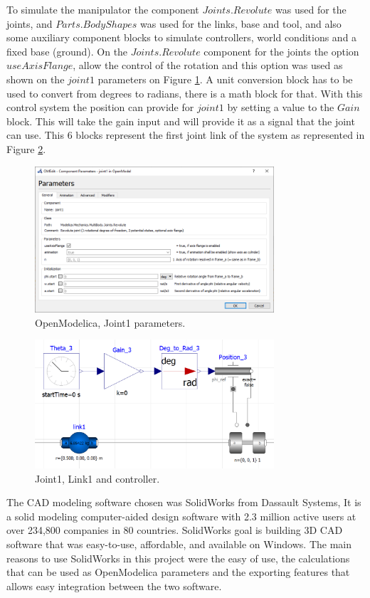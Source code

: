 \documentclass[transmag]{IEEEtran}
\begin{document}
To simulate the manipulator the component $Joints.Revolute$ was used for the joints, and $Parts.BodyShapes$ was used for the links, base and tool, and also some auxiliary component blocks to simulate controllers, world conditions and a fixed base (ground).
On the $Joints.Revolute$ component for the joints the option $useAxisFlange$, allow the control of the rotation and this option was used as shown on the $joint1$ parameters on Figure \ref{Joint1Parameters}. 
A unit conversion block has to be used to convert from degrees to radians, there is a math block for that. 
With this control system the position can provide for $joint1$ by setting a value to the $Gain$ block. This will take the gain input and will provide it as a signal that the joint can use. This 6 blocks represent the first joint link of the system as represented in Figure \ref{Joint1Link1+Controller}.



\begin{figure}
\centerline{\includegraphics[width=3.5in]{./images/Joint1Parameters}}
\caption{OpenModelica, Joint1 parameters.\label{Joint1Parameters}}
\end{figure}

\begin{figure}
\centerline{\includegraphics[width=3.5in]{./images/Joint1Link1+Controller}}
\caption{Joint1, Link1 and controller.\label{Joint1Link1+Controller}}
\end{figure}


The CAD modeling software chosen was SolidWorks from Dassault Systems, It is a solid modeling computer-aided design software with 2.3 million active users at over 234,800 companies in 80 countries. \cite{ref5} SolidWorks goal is building 3D CAD software that was easy-to-use, affordable, and available on Windows. \cite{ref6}
The main reasons to use SolidWorks in this project were the easy of use, the calculations that can be used as OpenModelica parameters and the exporting features that allows easy integration between the two software.
\end{document}
